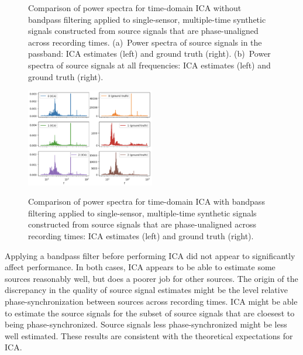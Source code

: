 \documentclass[10pt]{article}
\begin{document}
\begin{figure}[ht]
    \vspace{0.1in}
    \begin{minipage}{0.85\linewidth}
    \caption{\label{fig:single-sensor-ica-time-domain-phase-unaligned-without-filter-source-power-spectra}
        Comparison of power spectra for time-domain ICA without bandpass filtering applied
        to single-sensor, multiple-time synthetic signals constructed from source signals
        that are phase-unaligned across recording times.
        (a)~Power spectra of source signals in the passband: ICA estimates (left) and
        ground truth (right).
        (b)~Power spectra of source signals at all frequencies: ICA estimates (left)
        and ground truth (right).
    }
    \end{minipage}
\end{figure}

\begin{figure}[ht]
    \centering
    \includegraphics[width=0.5\textwidth]{single-sensor-ica-time-domain-phase-unaligned-with-filter-source-power-spectra}
    \begin{minipage}{0.85\linewidth}
    \caption{\label{fig:single-sensor-ica-time-domain-phase-unaligned-with-filter-source-power-spectra}}
        Comparison of power spectra for time-domain ICA with bandpass filtering applied to
        single-sensor, multiple-time synthetic signals constructed from source signals that
        are phase-unaligned across recording times: ICA estimates (left) and ground truth
        (right).
    \end{minipage}
\end{figure}

Applying a bandpass filter before performing ICA did not appear to significantly affect
performance. In both cases, ICA appears to be able to estimate some sources reasonably
well, but does a poorer job for other sources. The origin of the discrepancy in the quality
of source signal estimates might be the level relative phase-synchronization between
sources across recording times. ICA might be able to estimate the source signals for the
subset of source signals that are cloesest to being phase-synchronized. Source signals
less phase-synchronized might be less well estimated. These results are consistent with
the theoretical expectations for ICA.
\end{document}
